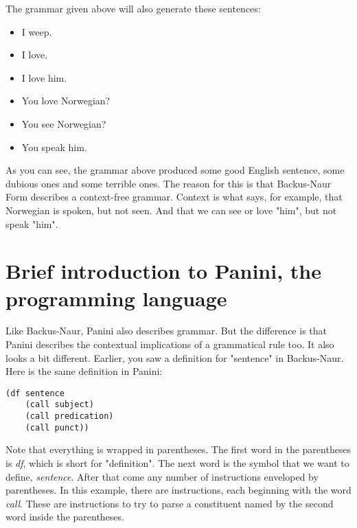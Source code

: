 \documentclass{article}
\begin{document}
The grammar given above will also generate these sentences:
\begin{itemize}
	\item I weep.
	\item I love.
	\item I love him.
	\item You love Norwegian?
	\item You see Norwegian?
	\item You speak him.
\end{itemize}

As you can see, the grammar above produced some good English sentence, some
dubious ones and some terrible ones. The reason for this is that Backus-Naur
Form describes a context-free grammar. Context is what says, for example, that
Norwegian is spoken, but not seen. And that we can see or love "him", but not
speak "him".

\section{Brief introduction to Panini, the programming language}
Like Backus-Naur, Panini also describes grammar. But the difference is that
Panini describes the contextual implications of a grammatical rule too. It also
looks a bit different. Earlier, you saw a definition for "sentence" in
Backus-Naur. Here is the same definition in Panini:
\begin{lstlisting}
(df sentence
	(call subject)
	(call predication)
	(call punct))
\end{lstlisting}
Note that everything is wrapped in parentheses. The first word in the
parentheses is \emph{df}, which is short for "definition". The next word is the
symbol that we want to define, \emph{sentence}. After that come any number of
instructions enveloped by parentheses. In this example, there are instructions,
each beginning with the word \emph{call}. These are instructions to try to 
parse a constituent named by the second word inside the parentheses. 
\end{document}
